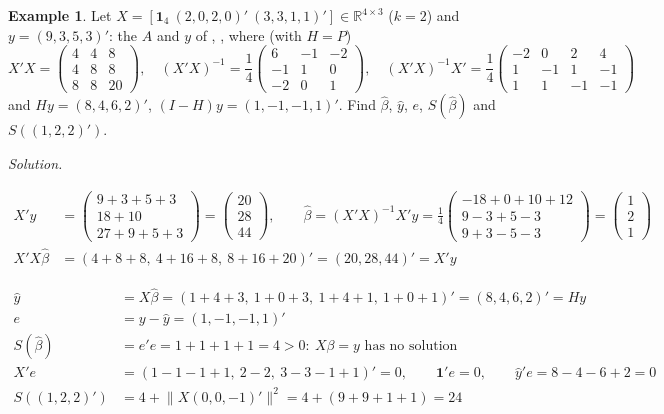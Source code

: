 \documentclass[12pt]{article}
\newcommand{\R}{\mathbb R}
\newcommand{\one}{\mathbf 1}
\DeclareMathOperator{\col}{col}
\DeclareMathOperator{\rank}{rank}
\theoremstyle{definition}
\newtheorem{example}[theorem]{Example}
\newcommand{\boardtop}{\vspace*{-\abovedisplayskip}}
\begin{document}
\begin{example}\label{h-exm-ls}
Let \(X=[\one_4\ (2,0,2,0)'\ (3,3,1,1)']\in\R^{4\times3}\) (\(k=2\)) and \(y=(9,3,5,3)'\): the \(A\) and \(y\) of
, , where (with \(H=P\))
\[
X'X=\begin{pmatrix}4&4&8\\4&8&8\\8&8&20\end{pmatrix},\quad
(X'X)^{-1}=\frac14\begin{pmatrix}6&-1&-2\\-1&1&0\\-2&0&1\end{pmatrix},\quad
(X'X)^{-1}X'=\frac14\begin{pmatrix}-2&0&2&4\\1&-1&1&-1\\1&1&-1&-1\end{pmatrix}
\]
and \(Hy=(8,4,6,2)'\), \((I-H)y=(1,-1,-1,1)'\). Find \(\hat\beta\), \(\hat y\), \(e\), \(S(\hat\beta)\) and
\(S((1,2,2)')\).
\end{example}
\textit{Solution.}
\begin{board}[\(X'X\) is invertible, so \(\rank X=3=p\) (Theorem~\ref{h-thm-normal}(b)): (A4) holds; \(X'y\) has the
entries \(\col_j(X)'y\) (\lec{1}, \lit{Theorem~4}(d), \lit{Definition~7}):]
\boardtop
\begin{align*}
X'y&=\begin{pmatrix}9+3+5+3\\18+10\\27+9+5+3\end{pmatrix}=\begin{pmatrix}20\\28\\44\end{pmatrix},\qquad
\hat\beta=(X'X)^{-1}X'y=\frac14\begin{pmatrix}-18+0+10+12\\9-3+5-3\\9+3-5-3\end{pmatrix}=\begin{pmatrix}1\\2\\1\end{pmatrix}\\
X'X\hat\beta&=(4+8+8,\ 4+16+8,\ 8+16+20)'=(20,28,44)'=X'y
\end{align*}
\end{board}
\begin{board}
\boardtop
\begin{align*}
\hat y&=X\hat\beta=(1+4+3,\ 1+0+3,\ 1+4+1,\ 1+0+1)'=(8,4,6,2)'=Hy\\
e&=y-\hat y=(1,-1,-1,1)'\\
S(\hat\beta)&=e'e=1+1+1+1=4>0:\ X\beta=y\text{ has no solution}\\
X'e&=(1-1-1+1,\ 2-2,\ 3-3-1+1)'=0,\qquad\one'e=0,\qquad\hat y'e=8-4-6+2=0\\
S((1,2,2)')&=4+\lVert X(0,0,-1)'\rVert^2=4+(9+9+1+1)=24
\end{align*}
\end{board}
\end{document}
